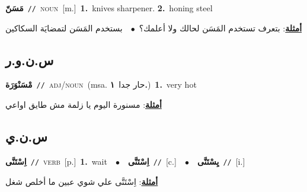 \documentclass[10pt,a4paper,twoside]{article} %
\begin{document}
\begin{multicols}{2}
{\setlength\topsep{0pt}\textbf{\foreignlanguage{arabic}{مَسَنّ}}\ {\color{gray}\texttt{//}\color{black}}\ \textsc{noun}\ [m.]\ \textbf{1.}~knives sharpener.  \textbf{2.}~honing steel\  \begin{flushright}\color{gray}\foreignlanguage{arabic}{\textbf{\underline{\foreignlanguage{arabic}{أمثلة}}}: بتعرف تستخدم المَسَن لحالك ولا أعلمك؟\ $\bullet$\ \  بستخدم المَسَن لتمضايَة السكاكين}\end{flushright}\color{black}} \vspace{2mm}

\vspace{-3mm}
\subsection*{\color{blue}\foreignlanguage{arabic}{س.ن.و.ر}\color{blue}{ (ntws)}} 

{\setlength\topsep{0pt}\textbf{\foreignlanguage{arabic}{مْسَنْوَرَة}}\ {\color{gray}\texttt{//}\color{black}}\ \textsc{adj/noun}\ \color{gray}(msa. \foreignlanguage{arabic}{حار جدا}~\foreignlanguage{arabic}{\textbf{١.}})\color{black}\ \textbf{1.}~very hot\  \begin{flushright}\color{gray}\foreignlanguage{arabic}{\textbf{\underline{\foreignlanguage{arabic}{أمثلة}}}: مسنورة اليوم يا زلمة مش طايق اواعي}\end{flushright}\color{black}} \vspace{2mm}

\vspace{-3mm}
\subsection*{\color{blue}\foreignlanguage{arabic}{س.ن.ي}\color{blue}{}} 

{\setlength\topsep{0pt}\textbf{\foreignlanguage{arabic}{اِسْتَنَّى}}\ {\color{gray}\texttt{//}\color{black}}\ \textsc{verb}\ [p.]\ \textbf{1.}~wait\ \ $\bullet$\ \ \setlength\topsep{0pt}\textbf{\foreignlanguage{arabic}{اِسْتَنَّى}}\ {\color{gray}\texttt{//}\color{black}}\ [c.]\ \ $\bullet$\ \ \setlength\topsep{0pt}\textbf{\foreignlanguage{arabic}{يِسْتَنَّى}}\ {\color{gray}\texttt{//}\color{black}}\ [i.]\  \begin{flushright}\color{gray}\foreignlanguage{arabic}{\textbf{\underline{\foreignlanguage{arabic}{أمثلة}}}: اِسْتَنَّى علي شوي عبين ما أخلص شغل}\end{flushright}\color{black}} \vspace{2mm}


\end{multicols}
\end{document}
